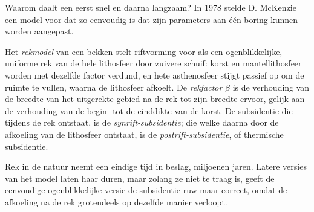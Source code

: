 Waarom daalt een  eerst snel en daarna langzaam? In 1978 stelde D. McKenzie een model voor dat zo
eenvoudig is dat zijn parameters aan één boring kunnen worden aangepast.

\begin{definition}\label{def:b2:basins-compared:stretching}
Het \emph{rekmodel} van een bekken stelt riftvorming voor als een
ogenblikkelijke, uniforme rek van de hele lithosfeer door zuivere schuif: korst en
mantellithosfeer worden met dezelfde factor verdund, en hete asthenosfeer stijgt passief op om de
ruimte te vullen, waarna de lithosfeer afkoelt. De \emph{rekfactor}
$\beta$ is de verhouding van de breedte van het uitgerekte gebied na de rek tot zijn breedte ervoor,
gelijk aan de verhouding van de begin- tot de einddikte van de korst. De subsidentie die
tijdens de rek ontstaat, is de \emph{synrift-subsidentie}; die welke
daarna door de afkoeling van de lithosfeer ontstaat, is de
\emph{postrift-subsidentie}, of thermische subsidentie.
\end{definition}

Rek in de natuur neemt een eindige tijd in beslag, miljoenen jaren. Latere versies van het model laten haar
duren, maar zolang ze niet te traag is, geeft de eenvoudige ogenblikkelijke versie de subsidentie
ruw maar correct, omdat de afkoeling na de rek grotendeels op dezelfde manier verloopt.

